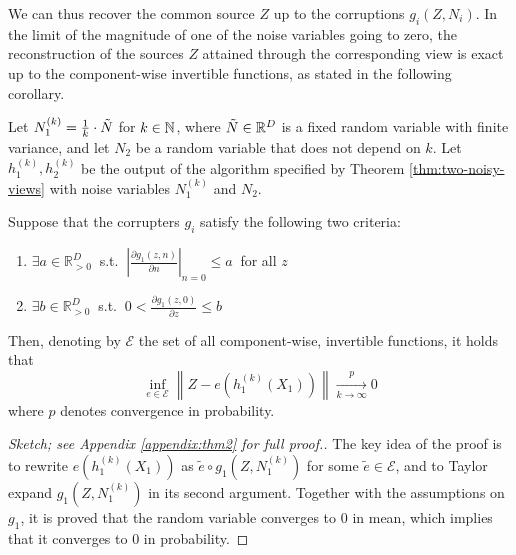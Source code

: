We can thus recover the common source $Z$ up to the corruptions ${g}_i(Z, N_i)$.
In the limit of the magnitude of one of the noise variables going to zero, the reconstruction of the sources $Z$ attained through the corresponding view is exact up to the component-wise invertible functions, as stated in the following corollary.

\medskip
\begin{corollary}
	\label{crl:lownoise}
	Let $N_1^{(k)} = \frac{1}{k} \cdot  \Tilde{N}$ for $k \in \mathbb{N}$, where $\Tilde{N}\in\mathbb{R}^D$ is a fixed random variable with finite variance, and let $N_2$ be a random variable that does not depend on $k$.
	Let $h_1^{(k)}, h_2^{(k)}$ be the output of the algorithm specified by Theorem \ref{thm:two-noisy-views} with noise variables $N_1^{(k)}$ and $N_2$.
	
	Suppose that the corrupters $g_i$ satisfy the following two criteria:
	\begin{enumerate}
		\item $\exists {a}  \in \mathbb{R}_{> 0}^D \: $   s.t. $\: \left|\frac{\partial g_1(z,n)}{\partial n} \right|_{n=0} \leq {a} \: $ for all ${z}$
		\item $\exists {b}  \in \mathbb{R}_{> 0}^D \: $ s.t. $\: 0<\frac{\partial g_1(z,0)}{\partial z} \leq b$
	\end{enumerate}
	Then, denoting by $\mathcal{E}$ the set of all component-wise, invertible functions, it holds that
	\[
	 \inf_{{e}\in \mathcal{E}}  \left \|Z - {e}(h_1^{(k)}(X_1)) \right \| \xrightarrow[k \to \infty]{p} 0
	\]
	where $p$ denotes convergence in probability.
\end{corollary}

\begin{proof}[Sketch; see Appendix \ref{appendix:thm2} for full proof.]
The key idea of the proof is to rewrite ${e}(h_1^{(k)}(X_1))$ as $\tilde{e} \circ g_1(Z, N_1^{(k)})$ for some $\tilde{e} \in \mathcal{E}$, and to Taylor expand $g_1(Z, N_1^{(k)})$ in its second argument.
Together with the assumptions on $g_1$, it is proved that the random variable converges to $0$ in mean, which implies that it converges to $0$ in probability.
\end{proof}

